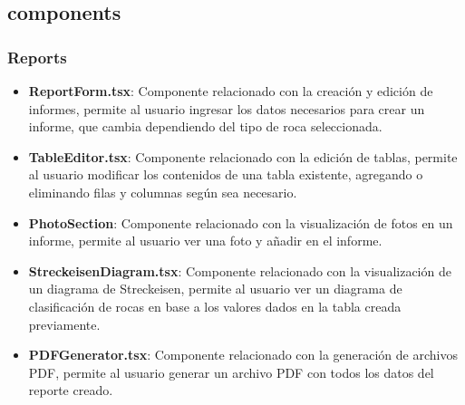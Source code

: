 \documentclass[a4paper,12pt]{article}
\begin{document}
\subsection{components}

\subsubsection{Reports}
\begin{itemize}
    \item \textbf{ReportForm.tsx}: Componente relacionado con la creación y edición de informes, permite al usuario ingresar los datos necesarios para crear un informe, que cambia dependiendo del tipo de roca seleccionada.
    \item \textbf{TableEditor.tsx}: Componente relacionado con la edición de tablas, permite al usuario modificar los contenidos de una tabla existente, agregando o eliminando filas y columnas según sea necesario.
    \item \textbf{PhotoSection}: Componente relacionado con la visualización de fotos en un informe, permite al usuario ver una foto y añadir en el informe.
    \item \textbf{StreckeisenDiagram.tsx}: Componente relacionado con la visualización de un diagrama de Streckeisen, permite al usuario ver un diagrama de clasificación de rocas en base a los valores dados en la tabla creada previamente.
    \item \textbf{PDFGenerator.tsx}: Componente relacionado con la generación de archivos PDF, permite al usuario generar un archivo PDF con todos los datos del reporte creado.
\end{itemize}
\end{document}

